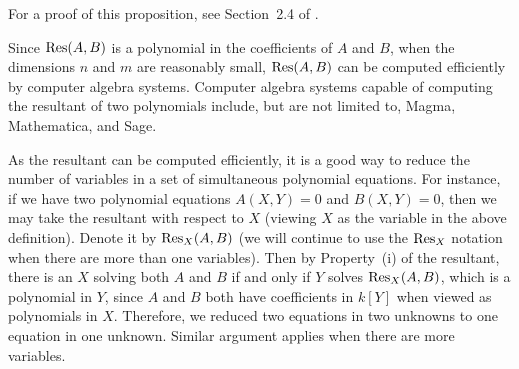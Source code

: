 For a proof of this proposition, see Section~2.4 of \cite{MR2316407}.

\begin{remark}
  Since $\mathrm{Res}(A, B)$ is a polynomial in the coefficients of $A$ and
  $B$, when the dimensions $n$ and $m$ are reasonably small, $\mathrm{Res}(A,
  B)$ can be computed efficiently by computer algebra
  systems. Computer algebra systems capable of computing the resultant
  of two polynomials include, but are not limited to, Magma,
  Mathematica, and Sage.

  As the resultant can be computed efficiently, it is a good way to
  reduce the number of variables in a set of simultaneous polynomial
  equations. For instance, if we have two polynomial equations $A(X,
  Y) = 0$ and $B(X, Y) = 0$, then we may take the resultant with
  respect to $X$ (viewing $X$ as the variable in the above
  definition). Denote it by $\mathrm{Res}_X(A, B)$ (we will continue to use
  the $\mathrm{Res}_X$ notation when there are more than one variables). Then
  by Property~(i) of the resultant, there is an $X$ solving both $A$
  and $B$ if and only if $Y$ solves $\mathrm{Res}_X(A, B)$, which is a
  polynomial in $Y$, since $A$ and $B$ both have coefficients in
  $k[Y]$ when viewed as polynomials in $X$. Therefore, we reduced two
  equations in two unknowns to one equation in one unknown. Similar
  argument applies when there are more variables.
\end{remark}

